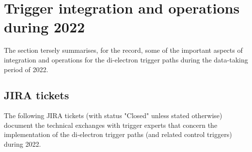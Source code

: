 \clearpage
\section{Trigger integration and operations during 2022}
\label{sec:operations}

  

The section tersely summarises, for the record, some of the important
aspects of integration and operations for the di-electron trigger
paths during the data-taking period of 2022.

\subsection{JIRA tickets}

The following JIRA tickets (with status "Closed" unless stated
otherwise) document the technical exchanges with trigger experts that
concern the implementation of the di-electron trigger paths (and
related control triggers) during 2022.


